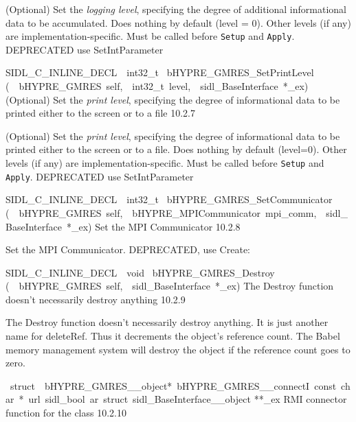 \documentclass{article}
\begin{document}
\begin{cxxentry}
\begin{cxxentry}
\begin{cxxfunction}
\begin{cxxdoc}
(Optional) Set the {\it logging level}, specifying the degree
of additional informational data to be accumulated.  Does
nothing by default (level = 0).  Other levels (if any) are
implementation-specific.  Must be called before {\tt Setup}
and {\tt Apply}.
DEPRECATED   use SetIntParameter
\end{cxxdoc}
\end{cxxfunction}
\begin{cxxfunction}
{SIDL\_C\_INLINE\_DECL\ \ int32\_t\ }
        {bHYPRE\_GMRES\_SetPrintLevel}
        {(\ \ bHYPRE\_GMRES\ self,\ \ int32\_t\ level,\ \ sidl\_BaseInterface\ *\_ex)}
        {
(Optional) Set the {\it print level}, specifying the degree
of informational data to be printed either to the screen or
to a file}
        {10.2.7}
\begin{cxxdoc}

(Optional) Set the {\it print level}, specifying the degree
of informational data to be printed either to the screen or
to a file.  Does nothing by default (level=0).  Other levels
(if any) are implementation-specific.  Must be called before
{\tt Setup} and {\tt Apply}.
DEPRECATED   use SetIntParameter
\end{cxxdoc}
\end{cxxfunction}
\begin{cxxfunction}
{SIDL\_C\_INLINE\_DECL\ \ int32\_t\ }
        {bHYPRE\_GMRES\_SetCommunicator}
        {(\ \ bHYPRE\_GMRES\ self,\ \ bHYPRE\_MPICommunicator\ mpi\_comm,\ \ sidl\_BaseInterface\ *\_ex)}
        {
Set the MPI Communicator}
        {10.2.8}
\begin{cxxdoc}

Set the MPI Communicator.
DEPRECATED, use Create:
\end{cxxdoc}
\end{cxxfunction}
\begin{cxxfunction}
{SIDL\_C\_INLINE\_DECL\ \ void\ }
        {bHYPRE\_GMRES\_Destroy}
        {(\ \ bHYPRE\_GMRES\ self,\ \ sidl\_BaseInterface\ *\_ex)}
        {
The Destroy function doesn't necessarily destroy anything}
        {10.2.9}
\begin{cxxdoc}

The Destroy function doesn't necessarily destroy anything.
It is just another name for deleteRef.  Thus it decrements the
object's reference count.  The Babel memory management system will
destroy the object if the reference count goes to zero.
\end{cxxdoc}
\end{cxxfunction}
\begin{cxxvariable}
{\ struct\ \ bHYPRE\_GMRES\_\_object*\ bHYPRE\_GMRES\_\_connectI\ const\ char\ *\ url\ sidl\_bool\ ar\ struct\ sidl\_BaseInterface\_\_object}
        {**\_ex}
        {}
        {
RMI connector function for the class}
        {10.2.10}
\begin{cxxdoc}


\end{cxxdoc}
\end{cxxvariable}
\end{cxxentry}
\end{cxxentry}
\end{document}
